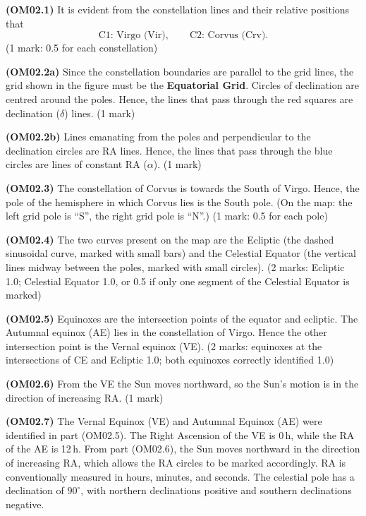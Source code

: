 \textbf{(OM02.1)} It is evident from the constellation lines and their
relative positions that
\[ \text{C1: Virgo (Vir)}, \qquad \text{C2: Corvus (Crv)}. \]
\hfill(1 mark: 0.5 for each constellation)

\textbf{(OM02.2a)} Since the constellation boundaries are parallel to the
grid lines, the grid shown in the figure must be the \textbf{Equatorial
Grid}. Circles of declination are centred around the poles. Hence, the
lines that pass through the red squares are declination ($\delta$) lines.
\hfill(1 mark)

\textbf{(OM02.2b)} Lines emanating from the poles and perpendicular to the
declination circles are RA lines. Hence, the lines that pass through the
blue circles are lines of constant RA ($\alpha$). \hfill(1 mark)

\textbf{(OM02.3)} The constellation of Corvus is towards the South of Virgo.
Hence, the pole of the hemisphere in which Corvus lies is the South pole.
(On the map: the left grid pole is ``S'', the right grid pole is ``N''.)
\hfill(1 mark: 0.5 for each pole)

\textbf{(OM02.4)} The two curves present on the map are the Ecliptic (the
dashed sinusoidal curve, marked with small bars) and the Celestial Equator
(the vertical lines midway between the poles, marked with small circles).
\hfill(2 marks: Ecliptic 1.0; Celestial Equator 1.0, or 0.5 if only one
segment of the Celestial Equator is marked)

\textbf{(OM02.5)} Equinoxes are the intersection points of the equator and
ecliptic. The Autumnal equinox (AE) lies in the constellation of Virgo.
Hence the other intersection point is the Vernal equinox (VE).
\hfill(2 marks: equinoxes at the intersections of CE and Ecliptic 1.0;
both equinoxes correctly identified 1.0)

\textbf{(OM02.6)} From the VE the Sun moves northward, so the Sun's motion
is in the direction of increasing RA. \hfill(1 mark)

\textbf{(OM02.7)} The Vernal Equinox (VE) and Autumnal Equinox (AE) were
identified in part (OM02.5). The Right Ascension of the VE is 0\,h, while
the RA of the AE is 12\,h. From part (OM02.6), the Sun moves northward in
the direction of increasing RA, which allows the RA circles to be marked
accordingly. RA is conventionally measured in hours, minutes, and seconds.
The celestial pole has a declination of $90^\circ$, with northern
declinations positive and southern declinations negative.

